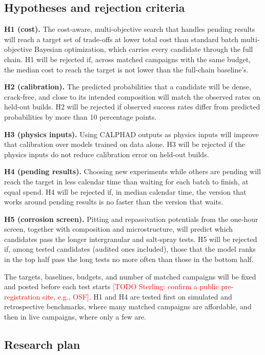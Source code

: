 \documentclass[12pt,letterpaper]{article}
\newcommand{\todo}[1]{\textcolor{red}{[TODO Sterling: #1]}}
\begin{document}
\subsection{Hypotheses and rejection criteria}

\textbf{H1 (cost).} The cost-aware, multi-objective search that handles
pending results will reach a target set of trade-offs at lower total cost
than standard batch multi-objective Bayesian optimization, which carries
every candidate through the full chain. H1 will be rejected if, across
matched campaigns with the same budget, the median cost to reach the target is
not lower than the full-chain baseline's.

\textbf{H2 (calibration).} The predicted probabilities that a candidate will
be dense, crack-free, and close to its intended composition will match the
observed rates on held-out builds. H2 will be rejected if observed success
rates differ from predicted probabilities by more than 10 percentage points.

\textbf{H3 (physics inputs).} Using CALPHAD outputs as physics inputs will
improve that calibration over models trained on data alone. H3 will be
rejected if the physics inputs do not reduce calibration error on held-out
builds.

\textbf{H4 (pending results).} Choosing new experiments while others are
pending will reach the target in less calendar time than waiting for each
batch to finish, at equal spend. H4 will be rejected if, in median calendar
time, the version that works around pending results is no faster than the
version that waits.

\textbf{H5 (corrosion screen).} Pitting and repassivation potentials from the
one-hour screen, together with composition and microstructure, will predict
which candidates pass the longer intergranular and salt-spray tests. H5 will
be rejected if, among tested candidates (audited ones included), those that
the model ranks in the top half pass the long tests no more often than those
in the bottom half.

The targets, baselines, budgets, and number of matched campaigns will be
fixed and posted before each test starts \todo{confirm a public
pre-registration site, e.g., OSF}. H1 and H4 are tested first on simulated
and retrospective benchmarks, where many matched campaigns are affordable, and
then in live campaigns, where only a few are.

\subsection{Research plan}
\end{document}
